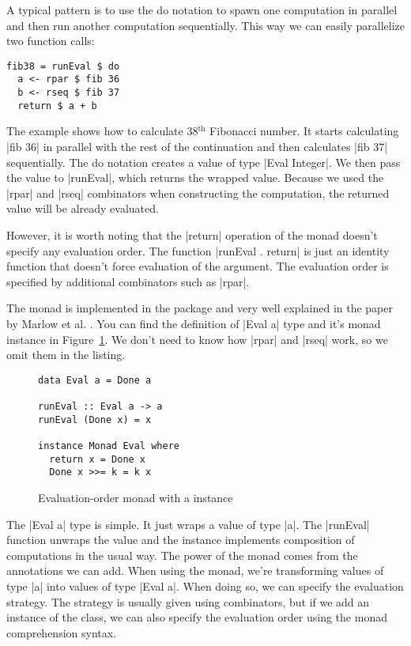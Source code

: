 \documentclass{tmr}
\begin{document}
A typical pattern is to use the do notation to spawn one computation in parallel and then 
run another computation sequentially. This way we can easily parallelize two function calls:

\begin{verbatim}
fib38 = runEval $ do 
  a <- rpar $ fib 36
  b <- rseq $ fib 37
  return $ a + b
\end{verbatim}
The example shows how to calculate 38$^\text{th}$ Fibonacci number. It starts calculating 
|fib 36| in parallel with the rest of the continuation and then calculates |fib 37| sequentially.
The do notation creates a value of type |Eval Integer|. We then pass the value to |runEval|, 
which returns the wrapped value. Because we used the |rpar| and |rseq| combinators when constructing 
the computation, the returned value will be already evaluated.

However, it is worth noting that the |return| operation of the monad doesn't specify any evaluation 
order. The function |runEval . return| is just an identity function that doesn't force evaluation 
of the argument. The evaluation order is specified by additional combinators such as |rpar|.

The  monad is implemented in the  package \cite{parallelpkg} and very 
well explained in the paper by Marlow et al. \cite{strategies-new}. You can find the definition of 
|Eval a| type and it's monad instance in Figure~\ref{fig:eval-monad}. We don't need to know how 
|rpar| and |rseq| work, so we omit them in the listing. 

\begin{figure}
\begin{verbatim}
data Eval a = Done a

runEval :: Eval a -> a
runEval (Done x) = x

instance Monad Eval where
  return x = Done x
  Done x >>= k = k x
\end{verbatim}
\caption{ Evaluation-order monad  with a  instance }
\label{fig:eval-monad}
\end{figure}

The |Eval a| type is simple. It just wraps a value of type |a|. The |runEval| function unwraps 
the value and the  instance implements composition of computations in the 
usual way. The power of the monad comes from the annotations we can add. When using the monad, 
we're transforming values of type |a| into values of type |Eval a|. When doing so, we can specify 
the evaluation strategy. The strategy is usually given using combinators, but if we add an 
instance of the  class, we can also specify the evaluation order using the monad 
comprehension syntax.
\end{document}
